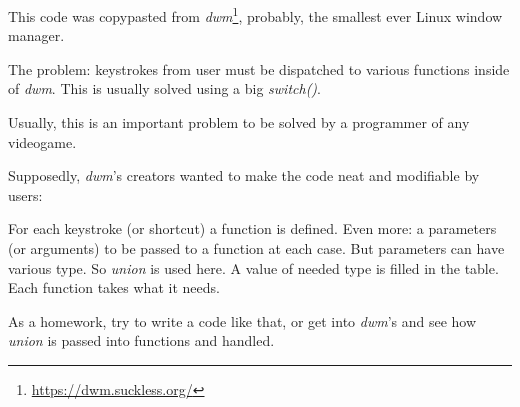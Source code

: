 
This code was copypasted from \emph{dwm}\footnote{\url{https://dwm.suckless.org/}}, probably, the smallest ever Linux window manager.

The problem: keystrokes from user must be dispatched to various functions inside of \emph{dwm}.
This is usually solved using a big \emph{switch()}.

Usually, this is an important problem to be solved by a programmer of any videogame.

Supposedly, \emph{dwm}'s creators wanted to make the code neat and modifiable by users:



For each keystroke (or shortcut) a function is defined.
Even more: a parameters (or arguments) to be passed to a function at each case.
But parameters can have various type.
So \emph{union} is used here.
A value of needed type is filled in the table.
Each function takes what it needs.

As a homework, try to write a code like that, or get into \emph{dwm}'s and see how \emph{union} is passed into functions and handled.

